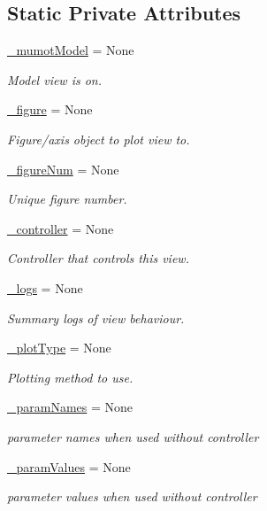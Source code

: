 \subsection*{Static Private Attributes}
\begin{DoxyCompactItemize}
\item 
\hyperlink{class_mu_mo_t_1_1_mu_mo_tview_aeacd9541246371f0db5cc3e3779762fa}{\+\_\+mumot\+Model} = None
\begin{DoxyCompactList}\small\item\em Model view is on. \end{DoxyCompactList}\item 
\hyperlink{class_mu_mo_t_1_1_mu_mo_tview_abf6d9f6be3898e307415d4598cde264d}{\+\_\+figure} = None
\begin{DoxyCompactList}\small\item\em Figure/axis object to plot view to. \end{DoxyCompactList}\item 
\hyperlink{class_mu_mo_t_1_1_mu_mo_tview_a5748371a5f2e09033908d21bb12f94c0}{\+\_\+figure\+Num} = None
\begin{DoxyCompactList}\small\item\em Unique figure number. \end{DoxyCompactList}\item 
\hyperlink{class_mu_mo_t_1_1_mu_mo_tview_a15f56ca9811d1e67d721fa64f9b0dc1e}{\+\_\+controller} = None
\begin{DoxyCompactList}\small\item\em Controller that controls this view. \end{DoxyCompactList}\item 
\hyperlink{class_mu_mo_t_1_1_mu_mo_tview_ac0ad5d0ca27f2668c0676334ee73ff52}{\+\_\+logs} = None
\begin{DoxyCompactList}\small\item\em Summary logs of view behaviour. \end{DoxyCompactList}\item 
\hyperlink{class_mu_mo_t_1_1_mu_mo_tview_a5feff4ca83ee97d6e09874496a4975d4}{\+\_\+plot\+Type} = None
\begin{DoxyCompactList}\small\item\em Plotting method to use. \end{DoxyCompactList}\item 
\hyperlink{class_mu_mo_t_1_1_mu_mo_tview_ac7734326ac8dbbf9bd0d2c9838633195}{\+\_\+param\+Names} = None
\begin{DoxyCompactList}\small\item\em parameter names when used without controller \end{DoxyCompactList}\item 
\hyperlink{class_mu_mo_t_1_1_mu_mo_tview_a04608181fa27d9aad4983d3694f7ab17}{\+\_\+param\+Values} = None
\begin{DoxyCompactList}\small\item\em parameter values when used without controller \end{DoxyCompactList}\end{DoxyCompactItemize}


